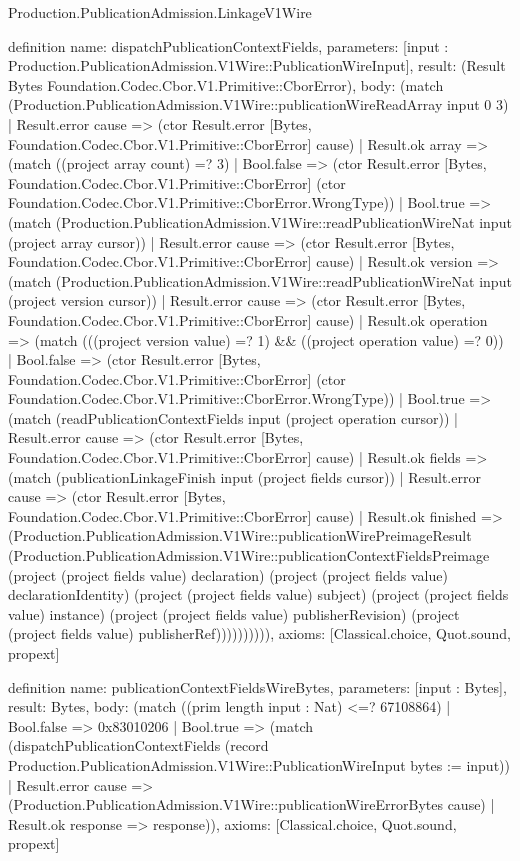 \begin{lexlean}{Production.PublicationAdmission.LinkageV1Wire}
\begin{semanticmodule}
definition{
  name: dispatchPublicationContextFields,
  parameters: [input : Production.PublicationAdmission.V1Wire::PublicationWireInput],
  result: (Result Bytes Foundation.Codec.Cbor.V1.Primitive::CborError),
  body: (match (Production.PublicationAdmission.V1Wire::publicationWireReadArray input 0 3)
    | Result.error cause => (ctor Result.error [Bytes, Foundation.Codec.Cbor.V1.Primitive::CborError] cause)
    | Result.ok array => (match ((project array count) =? 3)
      | Bool.false => (ctor Result.error [Bytes, Foundation.Codec.Cbor.V1.Primitive::CborError] (ctor Foundation.Codec.Cbor.V1.Primitive::CborError.WrongType))
      | Bool.true => (match (Production.PublicationAdmission.V1Wire::readPublicationWireNat input (project array cursor))
        | Result.error cause => (ctor Result.error [Bytes, Foundation.Codec.Cbor.V1.Primitive::CborError] cause)
        | Result.ok version => (match (Production.PublicationAdmission.V1Wire::readPublicationWireNat input (project version cursor))
          | Result.error cause => (ctor Result.error [Bytes, Foundation.Codec.Cbor.V1.Primitive::CborError] cause)
          | Result.ok operation => (match (((project version value) =? 1) && ((project operation value) =? 0))
            | Bool.false => (ctor Result.error [Bytes, Foundation.Codec.Cbor.V1.Primitive::CborError] (ctor Foundation.Codec.Cbor.V1.Primitive::CborError.WrongType))
            | Bool.true => (match (readPublicationContextFields input (project operation cursor))
              | Result.error cause => (ctor Result.error [Bytes, Foundation.Codec.Cbor.V1.Primitive::CborError] cause)
              | Result.ok fields => (match (publicationLinkageFinish input (project fields cursor))
                | Result.error cause => (ctor Result.error [Bytes, Foundation.Codec.Cbor.V1.Primitive::CborError] cause)
                | Result.ok finished => (Production.PublicationAdmission.V1Wire::publicationWirePreimageResult (Production.PublicationAdmission.V1Wire::publicationContextFieldsPreimage (project (project fields value) declaration) (project (project fields value) declarationIdentity) (project (project fields value) subject) (project (project fields value) instance) (project (project fields value) publisherRevision) (project (project fields value) publisherRef)))))))))),
  axioms: [Classical.choice, Quot.sound, propext]
}

definition{
  name: publicationContextFieldsWireBytes,
  parameters: [input : Bytes],
  result: Bytes,
  body: (match ((prim length input : Nat) <=? 67108864)
    | Bool.false => 0x83010206
    | Bool.true => (match (dispatchPublicationContextFields (record Production.PublicationAdmission.V1Wire::PublicationWireInput {bytes := input}))
      | Result.error cause => (Production.PublicationAdmission.V1Wire::publicationWireErrorBytes cause)
      | Result.ok response => response)),
  axioms: [Classical.choice, Quot.sound, propext]
}
\end{semanticmodule}
\end{lexlean}
